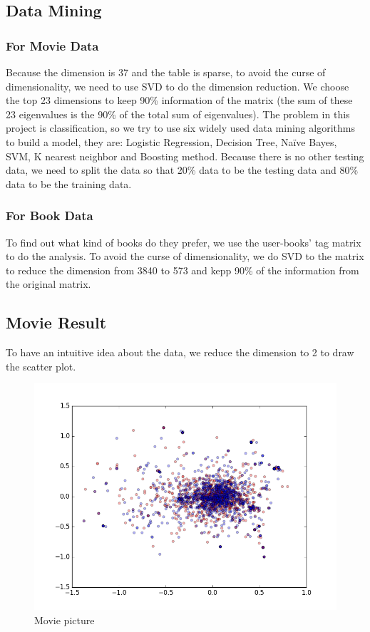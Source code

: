 \documentclass[12pt]{article}
\begin{document}
\subsection{Data Mining}
\subsubsection{For Movie Data}
Because the dimension is 37 and the table is sparse, to avoid the curse of dimensionality, we need to use SVD to do the dimension reduction. We choose the top 23 dimensions to keep 90\% information of the matrix (the sum of these 23 eigenvalues is the 90\% of the total sum of eigenvalues). The problem in this project is classification, so we try to use six widely used data mining algorithms to build a model, they are: Logistic Regression, Decision Tree, Naïve Bayes, SVM, K nearest neighbor and Boosting method. Because there is no other testing data, we need to split the data so that 20\% data to be the testing data and 80\% data to be the training data.

\subsubsection{For Book Data}
To find out what kind of books do they prefer, we use the user-books' tag matrix to do the analysis. To avoid the curse of dimensionality, we do SVD to the matrix to reduce the dimension from 3840 to 573 and kepp 90\% of the information from the original matrix.


\subsection{Movie Result}

To have an intuitive idea about the data, we reduce the dimension to 2 to draw the scatter plot.

\begin{figure}[h]
  \centering
  \includegraphics[width=0.3\linewidth]{../MovieFollowInformation/2Dmappingwithoutfollow.png}
  \caption{Movie picture}
  \label{fig:movie}
\end{figure}
\end{document}
